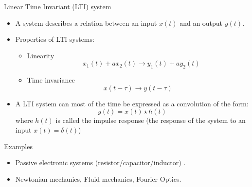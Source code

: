 \begin{block}{Linear Time Invariant (LTI) system}\vspace{-1mm}
  \begin{itemize}
  \item A system describes a relation between an input $x(t)$ and an output $y(t)$.
  \item Properties of LTI systems:\vspace{-1mm}
    \begin{itemize}
    \item Linearity \vspace{-3mm}
      $$\quad x_1(t)+ax_2(t)\rightarrow y_1(t)+ay_2(t)$$
    \item Time invariance\vspace{-3mm}
$$x(t-\tau)\rightarrow y(t-\tau)$$
    \end{itemize}
    \item A LTI system can most of the time be expressed as a convolution of the form:
    $$y(t)=x(t)\star h(t)$$
    where $h(t)$ is called the impulse response (the response of the system to an input $x(t)=\delta(t)$)
  \end{itemize}
\end{block}


\begin{exampleblock}{Examples}
\begin{itemize}
\item Passive electronic systems (resistor/capacitor/inductor) .
\item Newtonian mechanics, Fluid mechanics, Fourier Optics.
\end{itemize}
\end{exampleblock}



